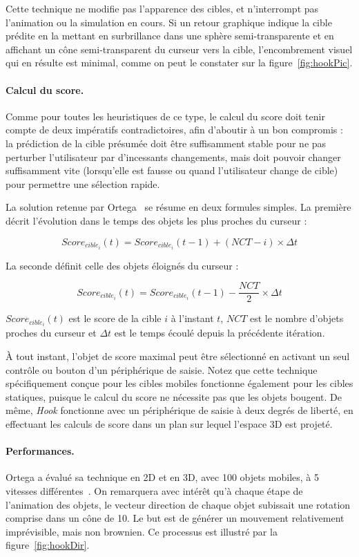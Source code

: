 	Cette technique ne modifie pas l'apparence des cibles, et n'interrompt pas l'animation ou la simulation en cours. Si un retour graphique indique la cible prédite en la mettant en surbrillance dans une sphère semi-transparente et en affichant un cône semi-transparent du curseur vers la cible, l'encombrement visuel qui en résulte est minimal, comme on peut le constater sur la figure~\ref{fig:hookPic}.
	
	\paragraph{Calcul du score.}
	Comme pour toutes les heuristiques de ce type, le calcul du score doit tenir compte de deux impératifs contradictoires, afin d'aboutir à un bon compromis : la prédiction de la cible présumée doit être suffisamment stable pour ne pas perturber l'utilisateur par d'incessants changements, mais doit pouvoir changer suffisamment vite (lorsqu'elle est fausse ou quand l'utilisateur change de cible) pour permettre une sélection rapide.
	
	La solution retenue par Ortega~\cite{ortega2013hook} se résume en deux formules simples. La première décrit l'évolution dans le temps des objets les plus proches du curseur :
	
	$$ Score_{cible_{i}}(t) = Score_{cible_{i}}(t-1) + (NCT - i) \times \Delta{}t $$
	
	La seconde définit celle des objets éloignés du curseur :
	
	$$ Score_{cible_{i}}(t) = Score_{cible_{i}}(t-1) - \frac{NCT}{2} \times \Delta{}t $$
	
	$Score_{cible_{i}}(t)$ est le score de la cible $i$ à l'instant $t$, $NCT$ est le nombre d'objets proches du curseur et $\Delta{}t$ est le temps écoulé depuis la précédente itération.
	
	À tout instant, l'objet de score maximal peut être sélectionné en activant un seul contrôle ou bouton d'un périphérique de saisie. Notez que cette technique spécifiquement conçue pour les cibles mobiles fonctionne également pour les cibles statiques, puisque le calcul du score ne nécessite pas que les objets bougent. De même, \emph{Hook} fonctionne avec un périphérique de saisie à deux degrés de liberté, en effectuant les calculs de score dans un plan sur lequel l'espace 3D est projeté.
	
	\paragraph{Performances.}
	Ortega a évalué sa technique en 2D et en 3D, avec 100 objets mobiles, à 5 vitesses différentes~\cite{ortega2013hook}. On remarquera avec intérêt qu'à chaque étape de l'animation des objets, le vecteur direction de chaque objet subissait une rotation comprise dans un cône de 10\textdegree. Le but est de générer un mouvement relativement imprévisible, mais non brownien. Ce processus est illustré par la figure~\ref{fig:hookDir}.
	
